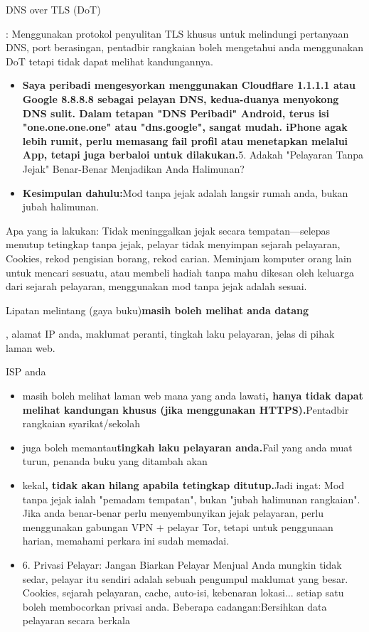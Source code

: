 DNS over TLS (DoT)

: Menggunakan protokol penyulitan TLS khusus untuk melindungi pertanyaan DNS, port berasingan, pentadbir rangkaian boleh mengetahui anda menggunakan DoT tetapi tidak dapat melihat kandungannya.

\begin{itemize}
  \item \textbf{Saya peribadi mengesyorkan menggunakan Cloudflare 1.1.1.1 atau Google 8.8.8.8 sebagai pelayan DNS, kedua-duanya menyokong DNS sulit. Dalam tetapan "DNS Peribadi" Android, terus isi "one.one.one.one" atau "dns.google", sangat mudah. iPhone agak lebih rumit, perlu memasang fail profil atau menetapkan melalui App, tetapi juga berbaloi untuk dilakukan.}5. Adakah "Pelayaran Tanpa Jejak" Benar-Benar Menjadikan Anda Halimunan?
  \item \textbf{Kesimpulan dahulu:}Mod tanpa jejak adalah langsir rumah anda, bukan jubah halimunan.
\end{itemize}

Apa yang ia lakukan: Tidak meninggalkan jejak secara tempatan—selepas menutup tetingkap tanpa jejak, pelayar tidak menyimpan sejarah pelayaran, Cookies, rekod pengisian borang, rekod carian. Meminjam komputer orang lain untuk mencari sesuatu, atau membeli hadiah tanpa mahu dikesan oleh keluarga dari sejarah pelayaran, menggunakan mod tanpa jejak adalah sesuai.


Lipatan melintang (gaya buku)\textbf{masih boleh melihat anda datang}

, alamat IP anda, maklumat peranti, tingkah laku pelayaran, jelas di pihak laman web.

ISP anda

\begin{itemize}
  \item masih boleh melihat laman web mana yang anda lawati\textbf{, hanya tidak dapat melihat kandungan khusus (jika menggunakan HTTPS).}Pentadbir rangkaian syarikat/sekolah
  \item juga boleh memantau\textbf{tingkah laku pelayaran anda.}Fail yang anda muat turun, penanda buku yang ditambah akan
  \item kekal\textbf{, tidak akan hilang apabila tetingkap ditutup.}Jadi ingat: Mod tanpa jejak ialah "pemadam tempatan", bukan "jubah halimunan rangkaian". Jika anda benar-benar perlu menyembunyikan jejak pelayaran, perlu menggunakan gabungan VPN + pelayar Tor, tetapi untuk penggunaan harian, memahami perkara ini sudah memadai.
  \item 6. Privasi Pelayar: Jangan Biarkan Pelayar Menjual Anda mungkin tidak sedar, pelayar itu sendiri adalah sebuah pengumpul maklumat yang besar. Cookies, sejarah pelayaran, cache, auto-isi, kebenaran lokasi... setiap satu boleh membocorkan privasi anda. Beberapa cadangan:Bersihkan data pelayaran secara berkala
\end{itemize}

